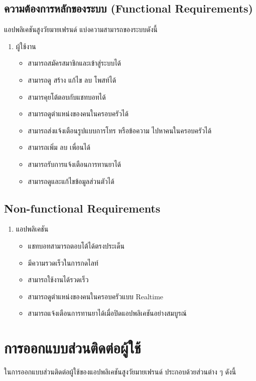 \subsection{ความต้องการหลักของระบบ (Functional Requirements)}
	แอปพลิเคชันสูงวัยมายเฟรนด์ แบ่งความสามารถของระบบดังนี้
	\begin{enumerate}
		\item ผู้ใช้งาน
			\begin{itemize}[label={--}]
				\item สามารถสมัครสมาชิกและเข้าสู่ระบบได้
				\item สามารถดู สร้าง แก้ไข ลบ โพสท์ได้
				\item สามารคุยโต้ตอบกับแชทบอทได้
				\item สามารถดูตำแหน่งของคนในครอบครัวได้
				\item สามารถส่งแจ้งเตือนรูปแบบการโทร หรือข้อความ ไปหาคนในครอบครัวได้
				\item สามารถเพิ่ม ลบ เพื่อนได้
				\item สามารถรับการแจ้งเตือนการทานยาได้
				\item สามารถดูและแก้ไขข้อมูลส่วนตัวได้
			\end{itemize}
	\end{enumerate}

\subsection{Non-functional Requirements}
\begin{enumerate}
		\item แอปพลิเคชัน
		\begin{itemize}[label={--}]
			\item แชทบอทสามารถตอบโต้ได้ตรงประเด็น
			\item มีความรวดเร็วในการกดไลท์
			\item สามารถใช้งานได้รวดเร็ว
			\item สามารถดูตำแหน่งของคนในครอบครัวแบบ Realtime
			\item สามารถแจ้งเตือนการทานยาได้เมื่อปิดแอปพลิเคชันอย่างสมบูรณ์
		\end{itemize}
	\end{enumerate}
	

\section{การออกแบบส่วนติดต่อผู้ใช้}
ในการออกแบบส่วนติดต่อผู้ใช้ของแอปพลิเคชันสูงวัยมายเฟรนด์ ประกอบด้วยส่วนต่าง ๆ ดังนี้
